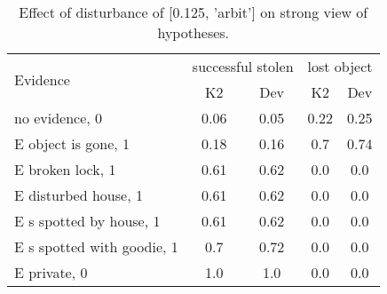 \begin{table}\begin{tabular}{l|cc|cc}\toprule\multirow{2}{*}{Evidence} & \multicolumn{2}{c}{successful stolen}& \multicolumn{2}{c}{lost object}\\& {K2} & {Dev}& {K2} & {Dev}\\\midrule
no evidence, 0 & 0.06&0.05&0.22&0.25\\E object is gone, 1 & 0.18&0.16&0.7&0.74\\E broken lock, 1 & 0.61&0.62&0.0&0.0\\E disturbed house, 1 & 0.61&0.62&0.0&0.0\\E s spotted by house, 1 & 0.61&0.62&0.0&0.0\\E s spotted with goodie, 1 & 0.7&0.72&0.0&0.0\\E private, 0 & 1.0&1.0&0.0&0.0\\\bottomrule\end{tabular}\caption{Effect of disturbance of [0.125, 'arbit'] on strong view of hypotheses.}\end{table}